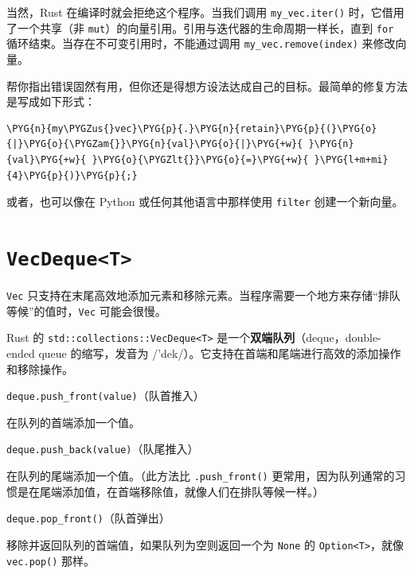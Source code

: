 当然，Rust 在编译时就会拒绝这个程序。当我们调用 \texttt{my\_vec.iter()} 时，它借用了一个共享（非 \texttt{mut}）的向量引用。引用与迭代器的生命周期一样长，直到 \texttt{for} 循环结束。当存在不可变引用时，不能通过调用 \texttt{my\_vec.remove(index)} 来修改向量。

帮你指出错误固然有用，但你还是得想方设法达成自己的目标。最简单的修复方法是写成如下形式：

\begin{Verbatim}[commandchars=\\\{\},breaklines=true,breakanywhere=true,fontsize=\codefont,xleftmargin=17bp]
\PYG{n}{my\PYGZus{}vec}\PYG{p}{.}\PYG{n}{retain}\PYG{p}{(}\PYG{o}{|}\PYG{o}{\PYGZam{}}\PYG{n}{val}\PYG{o}{|}\PYG{+w}{ }\PYG{n}{val}\PYG{+w}{ }\PYG{o}{\PYGZlt{}}\PYG{o}{=}\PYG{+w}{ }\PYG{l+m+mi}{4}\PYG{p}{)}\PYG{p}{;}
\end{Verbatim}

或者，也可以像在 Python 或任何其他语言中那样使用 \texttt{filter} 创建一个新向量。

\section{\texttt{VecDeque<T>}}

\texttt{Vec} 只支持在末尾高效地添加元素和移除元素。当程序需要一个地方来存储“排队等候”的值时，\texttt{Vec} 可能会很慢。

Rust 的 \texttt{std::collections::VecDeque<T>} 是一个\textbf{双端队列}（deque，double-ended queue 的缩写，发音为 /'dek/）。它支持在首端和尾端进行高效的添加操作和移除操作。

\begin{myNote}
\texttt{deque.push\_front(value)}（队首推入）
\end{myNote}

在队列的首端添加一个值。

\begin{myNote}
\texttt{deque.push\_back(value)}（队尾推入）
\end{myNote}

在队列的尾端添加一个值。（此方法比 \texttt{.push\_front()} 更常用，因为队列通常的习惯是在尾端添加值，在首端移除值，就像人们在排队等候一样。）

\begin{mySidenote}
\texttt{deque.pop\_front()}（队首弹出）
\end{mySidenote}

移除并返回队列的首端值，如果队列为空则返回一个为 \texttt{None} 的 \texttt{Option<T>}，就像 \texttt{vec.pop()} 那样。

